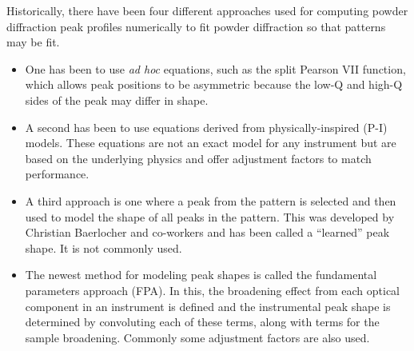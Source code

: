 Historically, there have been four different approaches used for computing powder diffraction peak profiles numerically to fit powder diffraction so that patterns may be fit. 

\begin{itemize}
\item
 One has been to use \textit{ad hoc} equations, such as the split Pearson VII function, which allows peak positions to be asymmetric because the low-Q and high-Q sides of the peak may differ in shape. 

\item
A second has been to use equations derived from physically-inspired (P-I) models. These equations are not an exact model for any instrument but are based on the underlying physics and offer adjustment factors to match performance. 

\item 
A third approach is one where a peak from the pattern is selected and then used to model the shape of all peaks in the pattern. This was developed by Christian Baerlocher and co-workers and has been called a “learned” peak shape. It is not commonly used.

\item 
The newest method for modeling peak shapes is called the fundamental parameters approach (FPA). In this, the broadening effect from each optical component in an instrument is defined and the instrumental peak shape is determined by convoluting each of these terms, along with terms for the sample broadening. Commonly some adjustment factors are also used. 
\end{itemize}

